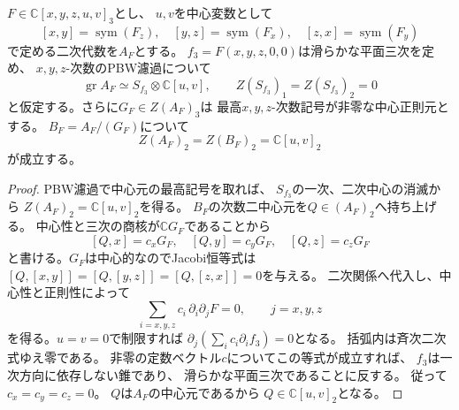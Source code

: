 \begin{lemma}[五生成元Jacobian族の次数二中心]
\label{lem:pg-ambient-center2-Jacobian}
$F\in\mathbb C[x,y,z,u,v]_3$とし、
$u,v$を中心変数として
\begin{equation}\label{eq:pg-ambient-Jacobian-rel}
 [x,y]=\operatorname{sym}(F_z),\quad
 [y,z]=\operatorname{sym}(F_x),\quad
 [z,x]=\operatorname{sym}(F_y)
\end{equation}
で定める二次代数を$A_F$とする。
$f_3=F(x,y,z,0,0)$は滑らかな平面三次を定め、
$x,y,z$-次数のPBW濾過について
\begin{equation}\label{eq:pg-ambient-Jacobian-gr}
 \operatorname{gr}A_F\simeq S_{f_3}\otimes\mathbb C[u,v],
 \qquad Z(S_{f_3})_1=Z(S_{f_3})_2=0
\end{equation}
と仮定する。さらに$G_F\in Z(A_F)_3$は
最高$x,y,z$-次数記号が非零な中心正則元とする。
$B_F=A_F/(G_F)$について
\begin{equation}\label{eq:pg-ambient-Jacobian-center2}
 Z(A_F)_2=Z(B_F)_2=\mathbb C[u,v]_2
\end{equation}
が成立する。
\end{lemma}
\begin{proof}
PBW濾過で中心元の最高記号を取れば、
$S_{f_3}$の一次、二次中心の消滅から
$Z(A_F)_2=\mathbb C[u,v]_2$を得る。
$B_F$の次数二中心元を$Q\in(A_F)_2$へ持ち上げる。
中心性と三次の商核が$\mathbb CG_F$であることから
\begin{equation}\label{eq:pg-ambient-Jacobian-Qcomm}
 [Q,x]=c_xG_F,\quad[Q,y]=c_yG_F,\quad
 [Q,z]=c_zG_F
\end{equation}
と書ける。$G_F$は中心的なのでJacobi恒等式は
$[Q,[x,y]]=[Q,[y,z]]=[Q,[z,x]]=0$を与える。
二次関係へ代入し、中心性と正則性によって
\begin{equation}\label{eq:pg-ambient-Jacobian-Hessian}
 \sum_{i=x,y,z}c_i\,\partial_i\partial_jF=0,
 \qquad j=x,y,z
\end{equation}
を得る。$u=v=0$で制限すれば
$\partial_j(\sum_i c_i\partial_i f_3)=0$となる。
括弧内は斉次二次式ゆえ零である。
非零の定数ベクトル$c$についてこの等式が成立すれば、
$f_3$は一次方向に依存しない錐であり、
滑らかな平面三次であることに反する。
従って$c_x=c_y=c_z=0$。
$Q$は$A_F$の中心元であるから
$Q\in\mathbb C[u,v]_2$となる。
\end{proof}

